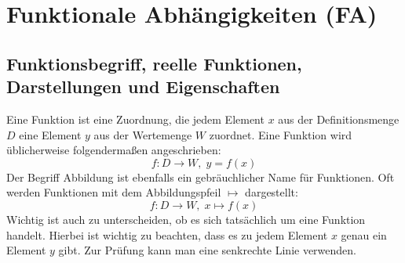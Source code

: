 \section{Funktionale Abhängigkeiten (FA)}
\subsection{Funktionsbegriff, reelle Funktionen, Darstellungen und Eigenschaften}
Eine Funktion ist eine Zuordnung, die jedem Element $x$ aus der Definitionsmenge $D$ eine Element $y$ aus der Wertemenge $W$ zuordnet. Eine Funktion wird üblicherweise folgendermaßen angeschrieben:
\begin{equation}
    f: D \rightarrow W,\; y=f(x)
\end{equation}
Der Begriff Abbildung ist ebenfalls ein gebräuchlicher Name für Funktionen. Oft werden Funktionen mit dem Abbildungspfeil $\mapsto$ dargestellt:
\begin{equation}
    f: D \rightarrow W,\; x \mapsto f(x)
\end{equation}
Wichtig ist auch zu unterscheiden, ob es sich tatsächlich um eine Funktion handelt. Hierbei ist wichtig zu beachten, dass es zu jedem Element $x$ genau ein Element $y$ gibt. Zur Prüfung kann man eine senkrechte Linie verwenden.
\vspace{10pt}
\\
\noindent
\begin{minipage}[t]{.33\textwidth}
\begin{center}
\end{center}
\end{minipage}
\begin{minipage}[t]{.33\textwidth}
\begin{center}
\end{center}
\end{minipage}
